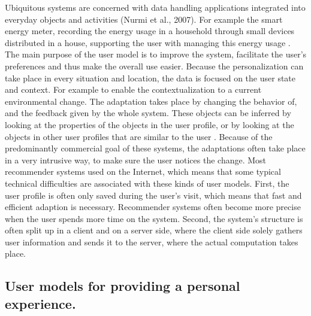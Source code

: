 Ubiquitous systems are concerned with data handling applications integrated into
everyday objects and activities (Nurmi et al., 2007).  For example the smart
energy meter, recording the energy usage in a household through small devices
distributed in a house, supporting the user with managing this energy
usage \cite{hargreaves2010making}.   
The main purpose of the user model is to
improve the system, facilitate the user’s preferences and thus make the overall
use easier.
Because the personalization can take place in every situation
and location, the data is focused on the user state and context. For example to
enable the contextualization to a current environmental change. 
The adaptation takes place by changing the behavior of, and the feedback given by the whole
system. These objects can be inferred by looking at the properties of the
objects in the user profile, or by looking at the objects in other user profiles
that are similar to the user \cite{kobsa2001generic} \cite{kay2012coming}. Because of the
predominantly commercial goal of these systems, the adaptations often take place
in a very intrusive way, to make sure the user notices the change.
Most recommender systems used on the Internet, which means that some typical
technical difficulties are associated with these kinds of user models. First,
the user profile is often only saved during the user’s visit,  which means that
fast and efficient adaption is necessary. Recommender systems often become more
precise when the user spends more time on the system. Second, the system’s
structure is often split up in a client and on a server side, where the client
side solely gathers user information and sends it to the server, where the
actual computation takes place.

\subsection{User models for providing a personal experience.}

